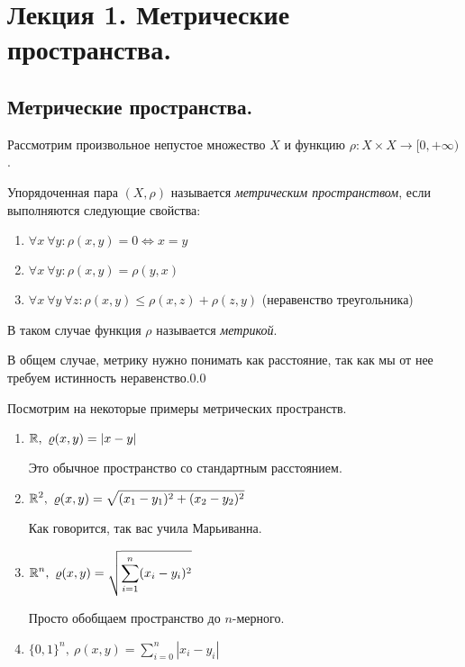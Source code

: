 \documentclass[../functional-analysis_17-18.tex]{subfiles}
\begin{document}
	\section{Лекция 1. Метрические пространства.}
	
	\subsection{Метрические пространства.}
	
	Рассмотрим произвольное непустое множество $X$ и функцию $\rho\colon X \times X \to [0, +\infty)$.
	\begin{definition}
		Упорядоченная пара $(X, \rho)$  называется \textit{метрическим пространством}, если выполняются следующие свойства:
		\begin{enumerate}
			\item $\forall x \ \forall y: \rho(x, y) = 0 \iff x = y$
			\item $\forall x \ \forall y: \rho(x, y) = \rho(y, x)$
			\item $\forall x \ \forall y \ \forall z: \rho(x, y) \leq \rho(x, z) + \rho(z, y)$ (неравенство треугольника)
		\end{enumerate}
		В таком случае функция $\rho$ называется \textit{метрикой}.
	\end{definition}
	
	В общем случае, метрику нужно понимать как расстояние, так как мы от нее требуем истинность неравенство.0.0
	
	Посмотрим на некоторые примеры метрических пространств.
	
	\begin{enumerate}
		\item $\mathbb{R},\ \varrho(x, y) = |x - y|$
		
		Это обычное пространство со стандартным расстоянием.
		
		\item $\displaystyle \mathbb{R}^2, \ \varrho(x, y) = \sqrt{(x_1 - y_1)^2 + (x_2 - y_2)^2}$
		
		Как говорится, так вас учила Марьиванна.
		
		\item $\displaystyle \mathbb{R}^n, \ \varrho(x, y) = \sqrt{\sum_{i = 1}^n (x_i - y_i)^2}$
		
		Просто обобщаем пространство до $n$-мерного.
		
		\item $\displaystyle \{0, 1\}^n, \ \rho(x, y) = \sum_{i = 0}^n |x_i - y_i|$
	\end{enumerate}
	
\end{document}
